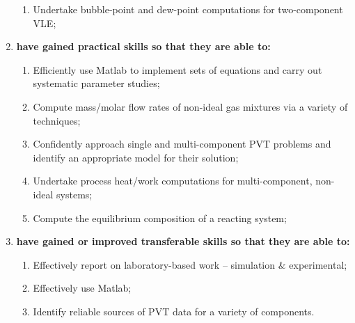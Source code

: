 \documentclass[12pts,a4paper,amsmath,amssymb,floatfix]{article}%
\begin{document}
\begin{enumerate}[{\bf A.}]
\begin{enumerate}
    \item Undertake bubble-point and dew-point computations for two-component VLE;
  \end{enumerate}
\item {\bf have gained practical skills so that they are able to:}
  \begin{enumerate}
    \item Efficiently use Matlab to implement sets of equations and carry out systematic parameter studies;
    \item Compute mass/molar flow rates of non-ideal gas mixtures via a variety of techniques;
    \item Confidently approach single and multi-component PVT problems and identify an appropriate model for their solution;
    \item Undertake process heat/work computations for multi-component, non-ideal systems;
    \item Compute the equilibrium composition of a reacting system;
  \end{enumerate}
\item {\bf have gained or improved transferable skills so that they are able to:}
  \begin{enumerate}
    \item Effectively report on laboratory-based work – simulation $\&$ experimental;
    \item Effectively use Matlab;
    \item Identify reliable sources of PVT data for a variety of components.
  \end{enumerate}
\end{enumerate}
\end{document}
